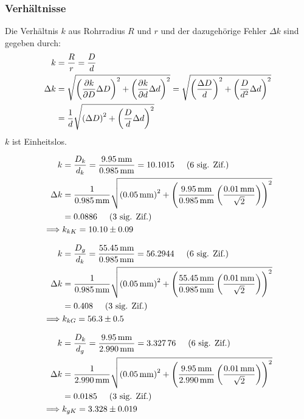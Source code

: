 		\subsubsection{Verhältnisse}
			Die Verhältnis $k$ aus Rohrradius $R$ und $r$ und der dazugehörige Fehler $\Delta k$ sind gegeben durch:
			\begin{align}
				k &= \frac{R}{r} = \frac{D}{d} \\
				\Delta k &= \gausserror{k}{D,d} = \sqrt{\pbrace{\frac{\Delta D}{d}}^2 + \pbrace{\frac{D}{d^2} \Delta d}^2} \notag \\
				&= \frac{1}{d}\sqrt{\pbrace{\Delta D}^2 + \pbrace{\frac{D}{d} \Delta d}^2} \label{eqn:kfehler}
			\end{align}
			$k$ ist Einheitslos.

			\begin{align}
				k &= \frac{D_k}{d_k} = \frac{\SI{9.95}{\milli\meter}}{\SI{0.985}{\milli\meter}} = \num{10.1015} \sigfig{6} \\
				\Delta k &= \frac{1}{\SI{0.985}{\milli\meter}}\sqrt{\pbrace{\SI{0.05}{\milli\meter}}^2 + \pbrace{\frac{\SI{9.95}{\milli\meter}}{\SI{0.985}{\milli\meter}} \pbrace{\frac{\SI{0.01}{\milli\meter}}{\sqrt{2}}}}^2} \notag \\
				&= \num{0.0886} \sigfig{3} \\
				\implies &k_{kK} = \num{10.10(9)}
			\end{align}

			\begin{align}
				k &= \frac{D_g}{d_k} = \frac{\SI{55.45}{\milli\meter}}{\SI{0.985}{\milli\meter}} = \num{56,2944} \sigfig{6} \\
				\Delta k &= \frac{1}{\SI{0.985}{\milli\meter}}\sqrt{\pbrace{\SI{0.05}{\milli\meter}}^2 + \pbrace{\frac{\SI{55.45}{\milli\meter}}{\SI{0.985}{\milli\meter}} \pbrace{\frac{\SI{0.01}{\milli\meter}}{\sqrt{2}}}}^2} \notag \\
				&= \num{0,408} \sigfig{3} \\
				\implies &k_{kG} = \num{56,3(5)}
			\end{align}

			\begin{align}
				k &= \frac{D_k}{d_g} = \frac{\SI{9.95}{\milli\meter}}{\SI{2,990}{\milli\meter}} = \num{3.32776} \sigfig{6} \\
				\Delta k &= \frac{1}{\SI{2,990}{\milli\meter}}\sqrt{\pbrace{\SI{0.05}{\milli\meter}}^2 + \pbrace{\frac{\SI{9.95}{\milli\meter}}{\SI{2,990}{\milli\meter}} \pbrace{\frac{\SI{0.01}{\milli\meter}}{\sqrt{2}}}}^2} \notag \\
				&= \num{0.0185} \sigfig{3} \\
				\implies &k_{gK} = \num{3.328(19)}
			\end{align}

